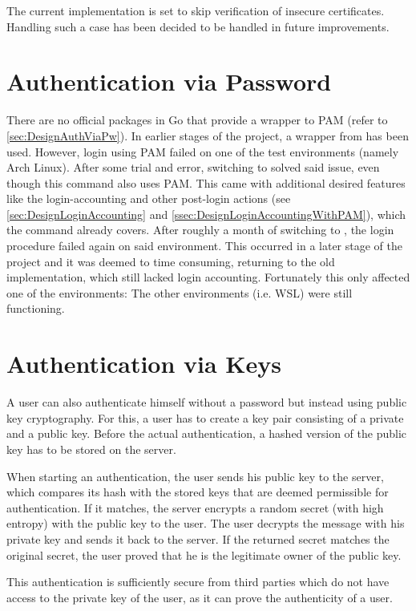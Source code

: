 \documentclass[10pt,a4paper,titlepage,twoside,english,final]{zhawreprt}
\begin{document}
The current implementation is set to skip verification of insecure certificates.
Handling such a case has been decided to be handled in future improvements.

\section{Authentication via Password}\label{sec:ImplAuthViaPw}
There are no official packages in \gls{Go} that provide a wrapper to \gls{PAM} (refer to \ref{sec:DesignAuthViaPw}).
In earlier stages of the project, a wrapper from \cite{gopam} has been used.
However, \gls{login} using \gls{PAM} failed on one of the test environments (namely Arch \gls{Linux}).
After some trial and error, switching to \cite{login} solved said issue, even though this command also uses \gls{PAM}.
This came with additional desired features like the \gls{login}-accounting and other post-\gls{login} actions (see \ref{sec:DesignLoginAccounting} and \ref{ssec:DesignLoginAccountingWithPAM}), which the command already covers.
After roughly a month of switching to \cite{login}, the \gls{login} procedure failed again on said environment.
This occurred in a later stage of the project and it was deemed to time consuming, returning to the old implementation, which still lacked \gls{login} accounting.
Fortunately this only affected one of the environments:
The other environments (i.e. \gls{WSL}) were still functioning.

\section{Authentication via Keys}\label{sec:ImplAuthViaKeys}
A user can also authenticate himself without a password but instead using public key cryptography.
For this, a user has to create a key pair consisting of a private and a public key.
Before the actual authentication, a hashed version of the public key has to be stored on the server.

When starting an authentication, the user sends his public key to the server, which compares its hash with the stored keys that are deemed permissible for authentication.
If it matches, the server encrypts a random secret (with high entropy) with the public key to the user.
The user decrypts the message with his private key and sends it back to the server.
If the returned secret matches the original secret, the user proved that he is the legitimate owner of the public key.

This authentication is sufficiently secure from third parties which do not have access to the private key of the user, as it can prove the authenticity of a user.
\end{document}
